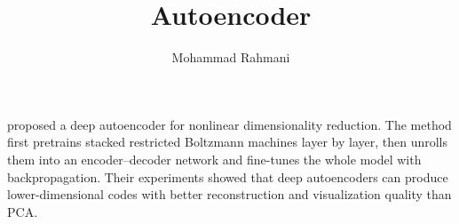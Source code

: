 \documentclass[a4paper]{article}
\title{Autoencoder}
\date{}
\author{Mohammad Rahmani}
\begin{document}
    \maketitle
    \cite{hinton-2006-reducing-the-dimensionality-of-data-with-neural-networks} proposed a deep autoencoder for nonlinear dimensionality reduction.
    The method first pretrains stacked restricted Boltzmann machines layer by layer, then unrolls them into an encoder--decoder network and fine-tunes the whole model with backpropagation.
    Their experiments showed that deep autoencoders can produce lower-dimensional codes with better reconstruction and visualization quality than PCA.
    
    
\end{document}
